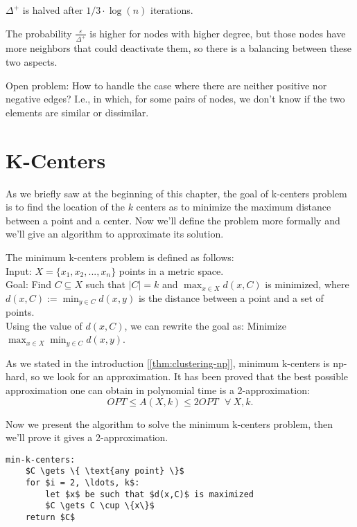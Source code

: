 \begin{thm}
    $\Delta^+$ is halved after $1/3 \cdot \log(n)$ iterations.
\end{thm}

\obs The probability $\frac{\varepsilon}{\Delta^+}$ is higher for nodes with higher degree, but those nodes have more neighbors that could deactivate them, so there is a balancing between these two aspects.

Open problem: How to handle the case where there are neither positive nor negative edges? I.e., in which, for some pairs of nodes, we don't know if the two elements are similar or dissimilar.


\section{K-Centers}\label{sec:k-centers}

As we briefly saw at the beginning of this chapter, the goal of k-centers problem is to find the location of the $k$ centers as to minimize the maximum distance between a point and a center. Now we'll define the problem more formally and we'll give an algorithm to approximate its solution.

\begin{defn}\label{def:k-centers}
    The minimum k-centers problem is defined as follows:\\
    Input: $X = \{x_1, x_2, ..., x_n\}$ points in a metric space.\\
    Goal: Find $C \subseteq X$ such that $|C| = k$ and $\max_{x \in X} d(x,C)$ is minimized, where $d(x,C) := \min_{y \in C} d(x,y)$ is the distance between a point and a set of points.\\
    Using the value of $d(x,C)$, we can rewrite the goal as: Minimize $\max_{x \in X} \min_{y \in C} d(x, y)$.
\end{defn}

As we stated in the introduction [\ref{thm:clustering-np}], minimum k-centers is np-hard, so we look for an approximation. It has been proved that the best possible approximation one can obtain in polynomial time is a 2-approximation: $$OPT \leq A(X,k) \leq 2 OPT \ \ \ \forall\ X,k.$$

Now we present the algorithm to solve the minimum k-centers problem, then we'll prove it gives a 2-approximation.

\begin{lstlisting}[caption={Minimum k-centers}, label={lst:min-k-centers}]
min-k-centers:
    $C \gets \{ \text{any point} \}$
    for $i = 2, \ldots, k$:
        let $x$ be such that $d(x,C)$ is maximized
        $C \gets C \cup \{x\}$
    return $C$
\end{lstlisting}

